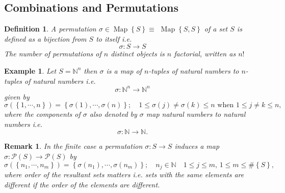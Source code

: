 \documentclass[aps,preprint]{revtex4}%
\newtheorem{definition}[theorem]{Definition}
\newtheorem{example}[theorem]{Example}
\newtheorem{remark}[theorem]{Remark}
\begin{document}
\subsection{Combinations and Permutations}

\begin{definition}
A \emph{permutation} $\sigma\in\operatorname*{Map}\left\{  S\right\}  \equiv$
$\operatorname*{Map}\left\{  S,S\right\}  $ of a set $S$ is defined as a
\emph{bijection} from $S$ to itself i.e.%
\begin{equation}
\sigma:S\rightarrow S
\end{equation}
The number of permutations of $n$ distinct objects is $n$ factorial, written
as $n!$
\end{definition}

\begin{example}
Let $S=\mathbb{N}^{n}$ then $\sigma$ is a map of $n$-tuples of natural numbers
to $n$-tuples of natural numbers i.e.
\begin{equation}
\sigma:\mathbb{N}^{n}\rightarrow\mathbb{N}^{n}%
\end{equation}
given by
\begin{equation}
\sigma\left(  \left\{  1,\cdots,n\right\}  \right)  =\left\{  \sigma\left(
1\right)  ,\cdots,\sigma\left(  n\right)  \right\}  ;\quad1\leq\sigma\left(
j\right)  \neq\sigma\left(  k\right)  \leq n\text{ when }1\leq j\neq k\leq n,
\end{equation}
where the components of $\sigma$ also denoted by $\sigma$ map natural numbers
to natural numbers i.e.
\begin{equation}
\sigma:\mathbb{N}\rightarrow\mathbb{N}.
\end{equation}

\end{example}

\begin{remark}
In the finite case a \emph{permutation} $\sigma:S\rightarrow S$ induces a map
$\sigma:\mathcal{P}\left(  S\right)  \rightarrow\mathcal{P}\left(  S\right)  $
by
\begin{equation}
\sigma\left(  \left\{  n_{1},\cdots,n_{m}\right\}  \right)  =\left\{
\sigma\left(  n_{1}\right)  ,\cdots,\sigma\left(  n_{m}\right)  \right\}
;\quad n_{j}\in\mathbb{N}\quad1\leq j\leq m,\,1\leq m\leq\#\left\{  S\right\}
,
\end{equation}
where order of the resultant sets matters i.e. sets with the same elements are
different if the order of the elements are different.
\end{remark}
\end{document}
